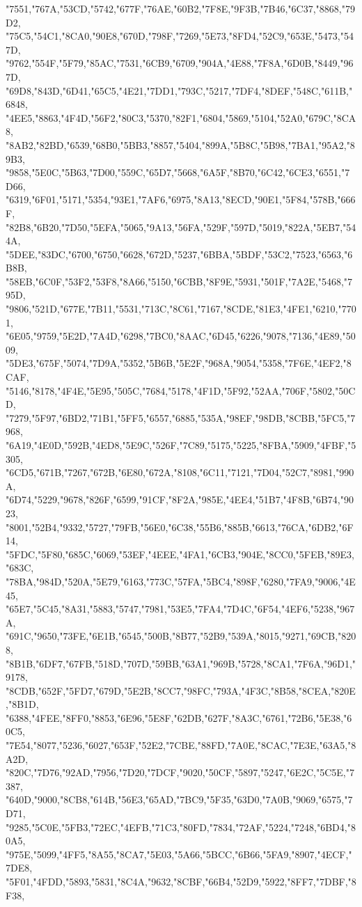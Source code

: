 \documentclass{ltjsarticle}
\begin{document}
{  "7551,"767A,"53CD,"5742,"677F,"76AE,"60B2,"7F8E,"9F3B,"7B46,"6C37,"8868,"79D2,
  "75C5,"54C1,"8CA0,"90E8,"670D,"798F,"7269,"5E73,"8FD4,"52C9,"653E,"5473,"547D,
  "9762,"554F,"5F79,"85AC,"7531,"6CB9,"6709,"904A,"4E88,"7F8A,"6D0B,"8449,"967D,
  "69D8,"843D,"6D41,"65C5,"4E21,"7DD1,"793C,"5217,"7DF4,"8DEF,"548C,"611B,"6848,
  "4EE5,"8863,"4F4D,"56F2,"80C3,"5370,"82F1,"6804,"5869,"5104,"52A0,"679C,"8CA8,
  "8AB2,"82BD,"6539,"68B0,"5BB3,"8857,"5404,"899A,"5B8C,"5B98,"7BA1,"95A2,"89B3,
  "9858,"5E0C,"5B63,"7D00,"559C,"65D7,"5668,"6A5F,"8B70,"6C42,"6CE3,"6551,"7D66,
  "6319,"6F01,"5171,"5354,"93E1,"7AF6,"6975,"8A13,"8ECD,"90E1,"5F84,"578B,"666F,
  "82B8,"6B20,"7D50,"5EFA,"5065,"9A13,"56FA,"529F,"597D,"5019,"822A,"5EB7,"544A,
  "5DEE,"83DC,"6700,"6750,"6628,"672D,"5237,"6BBA,"5BDF,"53C2,"7523,"6563,"6B8B,
  "58EB,"6C0F,"53F2,"53F8,"8A66,"5150,"6CBB,"8F9E,"5931,"501F,"7A2E,"5468,"795D,
  "9806,"521D,"677E,"7B11,"5531,"713C,"8C61,"7167,"8CDE,"81E3,"4FE1,"6210,"7701,
  "6E05,"9759,"5E2D,"7A4D,"6298,"7BC0,"8AAC,"6D45,"6226,"9078,"7136,"4E89,"5009,
  "5DE3,"675F,"5074,"7D9A,"5352,"5B6B,"5E2F,"968A,"9054,"5358,"7F6E,"4EF2,"8CAF,
  "5146,"8178,"4F4E,"5E95,"505C,"7684,"5178,"4F1D,"5F92,"52AA,"706F,"5802,"50CD,
  "7279,"5F97,"6BD2,"71B1,"5FF5,"6557,"6885,"535A,"98EF,"98DB,"8CBB,"5FC5,"7968,
  "6A19,"4E0D,"592B,"4ED8,"5E9C,"526F,"7C89,"5175,"5225,"8FBA,"5909,"4FBF,"5305,
  "6CD5,"671B,"7267,"672B,"6E80,"672A,"8108,"6C11,"7121,"7D04,"52C7,"8981,"990A,
  "6D74,"5229,"9678,"826F,"6599,"91CF,"8F2A,"985E,"4EE4,"51B7,"4F8B,"6B74,"9023,
  "8001,"52B4,"9332,"5727,"79FB,"56E0,"6C38,"55B6,"885B,"6613,"76CA,"6DB2,"6F14,
  "5FDC,"5F80,"685C,"6069,"53EF,"4EEE,"4FA1,"6CB3,"904E,"8CC0,"5FEB,"89E3,"683C,
  "78BA,"984D,"520A,"5E79,"6163,"773C,"57FA,"5BC4,"898F,"6280,"7FA9,"9006,"4E45,
  "65E7,"5C45,"8A31,"5883,"5747,"7981,"53E5,"7FA4,"7D4C,"6F54,"4EF6,"5238,"967A,
  "691C,"9650,"73FE,"6E1B,"6545,"500B,"8B77,"52B9,"539A,"8015,"9271,"69CB,"8208,
  "8B1B,"6DF7,"67FB,"518D,"707D,"59BB,"63A1,"969B,"5728,"8CA1,"7F6A,"96D1,"9178,
  "8CDB,"652F,"5FD7,"679D,"5E2B,"8CC7,"98FC,"793A,"4F3C,"8B58,"8CEA,"820E,"8B1D,
  "6388,"4FEE,"8FF0,"8853,"6E96,"5E8F,"62DB,"627F,"8A3C,"6761,"72B6,"5E38,"60C5,
  "7E54,"8077,"5236,"6027,"653F,"52E2,"7CBE,"88FD,"7A0E,"8CAC,"7E3E,"63A5,"8A2D,
  "820C,"7D76,"92AD,"7956,"7D20,"7DCF,"9020,"50CF,"5897,"5247,"6E2C,"5C5E,"7387,
  "640D,"9000,"8CB8,"614B,"56E3,"65AD,"7BC9,"5F35,"63D0,"7A0B,"9069,"6575,"7D71,
  "9285,"5C0E,"5FB3,"72EC,"4EFB,"71C3,"80FD,"7834,"72AF,"5224,"7248,"6BD4,"80A5,
  "975E,"5099,"4FF5,"8A55,"8CA7,"5E03,"5A66,"5BCC,"6B66,"5FA9,"8907,"4ECF,"7DE8,
  "5F01,"4FDD,"5893,"5831,"8C4A,"9632,"8CBF,"66B4,"52D9,"5922,"8FF7,"7DBF,"8F38,
}
\end{document}
